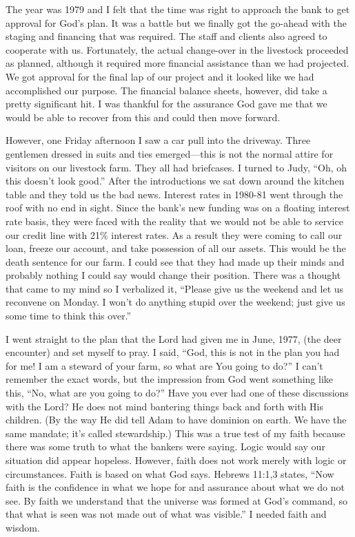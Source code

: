 \documentclass[oneside]{book}
\begin{document}
The year was 1979 and I felt that the time was right to approach the bank to get approval for God’s plan. It was a battle but we finally got the go-ahead with the staging and financing that was required. The staff and clients also agreed to cooperate with us. Fortunately, the actual change-over in the livestock proceeded as planned, although it required more financial assistance than we had projected. We got approval for the final lap of our project and it looked like we had accomplished our purpose. The financial balance sheets, however, did take a pretty significant hit. I was thankful for the assurance God gave me that we would be able to recover from this and could then move forward. 

However, one Friday afternoon I saw a car pull into the driveway. Three gentlemen dressed in suits and ties emerged—this is not the normal attire for visitors on our livestock farm. They all had briefcases. I turned to Judy, “Oh, oh this doesn't look good.” After the introductions we sat down around the kitchen table and they told us the bad news. Interest rates in 1980-81 went through the roof with no end in sight. Since the bank's new funding was on a floating interest rate basis, they were faced with the reality that we would not be able to service our credit line with 21\% interest rates. As a result they were coming to call our loan, freeze our account, and take possession of all our assets. This would be the death sentence for our farm. I could see that they had made up their minds and probably nothing I could say would change their position. There was a thought that came to my mind so I verbalized it, “Please give us the weekend and let us reconvene on Monday. I won't do anything stupid over the weekend; just give us some time to think this over.”

I went straight to the plan that the Lord had given me in June, 1977, (the deer encounter) and set myself to pray. I said, “God, this is not in the plan you had for me!  I am a steward of your farm, so what are You going to do?” I can't remember the exact words, but the impression from God went something like this, “No, what are you going to do?” Have you ever had one of these discussions with the Lord? He does not mind bantering things back and forth with His children. (By the way He did tell Adam to have dominion on earth. We have the same mandate; it’s called stewardship.) This was a true test of my faith because there was some truth to what the bankers were saying. Logic would say our situation did appear hopeless. However, faith does not work merely with logic or circumstances. Faith is based on what God says. Hebrews 11:1,3 states, “Now faith is the confidence in what we hope for and assurance about what we do not see. By faith we understand that the universe was formed at God’s command, so that what is seen was not made out of what was visible.” I needed faith and wisdom. 
\end{document}
